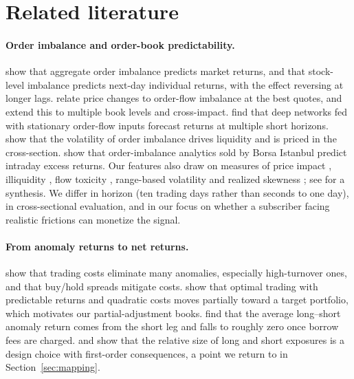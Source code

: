 \section{Related literature}\label{sec:lit}

\paragraph{Order imbalance and order-book predictability.}
\citet{chordia2002} show that aggregate order imbalance predicts market returns, and \citet{chordia2004} that stock-level imbalance predicts next-day individual returns, with the effect reversing at longer lags. \citet{cont2014} relate price changes to order-flow imbalance at the best quotes, and \citet{cont2023} extend this to multiple book levels and cross-impact. \citet{kolm2023} find that deep networks fed with stationary order-flow inputs forecast returns at multiple short horizons. \citet{bogousslavsky2023} show that the volatility of order imbalance drives liquidity and is priced in the cross-section. \citet{akyildirim2021} show that order-imbalance analytics sold by Borsa Istanbul predict intraday excess returns. Our features also draw on measures of price impact \citep{kyle1985}, illiquidity \citep{amihud2002}, flow toxicity \citep{easley2012}, range-based volatility \citep{parkinson1980} and realized skewness \citep{amaya2015}; see \citet{bouchaud2018} for a synthesis. We differ in horizon (ten trading days rather than seconds to one day), in cross-sectional evaluation, and in our focus on whether a subscriber facing realistic frictions can monetize the signal.

\paragraph{From anomaly returns to net returns.}
\citet{novymarx2016} show that trading costs eliminate many anomalies, especially high-turnover ones, and that buy/hold spreads mitigate costs. \citet{garleanu2013} show that optimal trading with predictable returns and quadratic costs moves partially toward a target portfolio, which motivates our partial-adjustment books. \citet{muravyev2025} find that the average long--short anomaly return comes from the short leg and falls to roughly zero once borrow fees are charged. \citet{jacobs1998} and \citet{grinold2000b} show that the relative size of long and short exposures is a design choice with first-order consequences, a point we return to in Section~\ref{sec:mapping}.

